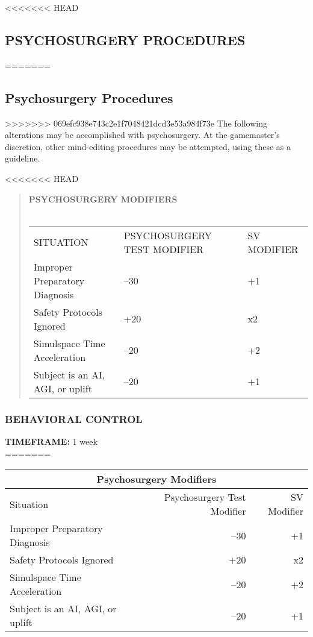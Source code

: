 <<<<<<< HEAD
\subsection{PSYCHOSURGERY PROCEDURES}
=======
\subsection{Psychosurgery Procedures}
>>>>>>> 069efc938e743c2e1f7048421dcd3e53a984f73e
The following alterations may be accomplished with
psychosurgery. At the gamemaster’s discretion, other
mind-editing procedures may be attempted, using
these as a guideline.

<<<<<<< HEAD
\begin{quotation}
\textbf{PSYCHOSURGERY MODIFIERS}
\\
\\
\begin{tabular}{lll}
SITUATION & PSYCHOSURGERY TEST MODIFIER & SV MODIFIER \\
Improper Preparatory Diagnosis & –30 & +1 \\
Safety Protocols Ignored & +20 & x2 \\
Simulspace Time Acceleration & –20 & +2 \\
Subject is an AI, AGI, or uplift & –20 & +1 \\
\end{tabular} 
\end{quotation}

\subsubsection{BEHAVIORAL CONTROL}
\textbf{TIMEFRAME:} 1 week \\
=======
\begin{table}
\begin{tabular}{|l|r|r|}
\hline
\multicolumn{3}{|c|}{\textbf{Psychosurgery Modifiers}} \\
\hline
Situation & Psychosurgery Test Modifier & SV Modifier \\
\hline
Improper Preparatory Diagnosis & –30 & +1 \\
\hline
Safety Protocols Ignored & +20 & x2 \\
\hline
Simulspace Time Acceleration & –20 & +2 \\
\hline
Subject is an AI, AGI, or uplift & –20 & +1 \\
\hline
\end{tabular}
\label{tab:psychosurgery-modifiers}
\end{table}

